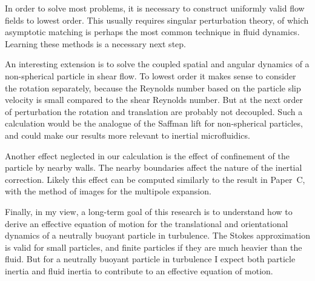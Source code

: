 \documentclass[thesis.tex]{subfiles}
\begin{document}
In order to solve most problems, it is necessary to construct uniformly valid flow fields to lowest order. This usually requires singular perturbation theory, of which asymptotic matching is perhaps the most common technique in fluid dynamics. Learning these methods is a necessary next step.

An interesting extension is to solve the coupled spatial and angular dynamics of a non-spherical particle in shear flow. To lowest order it makes sense to consider the rotation separately, because the Reynolds number based on the particle slip velocity is small compared to the shear Reynolds number. But at the next order of perturbation the rotation and translation are probably not decoupled. Such a calculation would be the analogue of the Saffman lift for non-spherical particles, and could make our results more relevant to inertial microfluidics.

Another effect neglected in our calculation is the effect of confinement of the particle by nearby walls. The nearby boundaries affect the nature of the inertial correction. Likely this effect can be computed similarly to the result in Paper~C, with the method of images for the multipole expansion.

Finally, in my view, a long-term goal of this research is to understand how to derive an effective equation of motion for the translational and orientational dynamics of a neutrally buoyant particle in turbulence. The Stokes approximation is valid for small particles, and finite particles if they are much heavier than the fluid. But for a neutrally buoyant particle in turbulence I expect both particle inertia and fluid inertia to contribute to an effective equation of motion.
\end{document}
